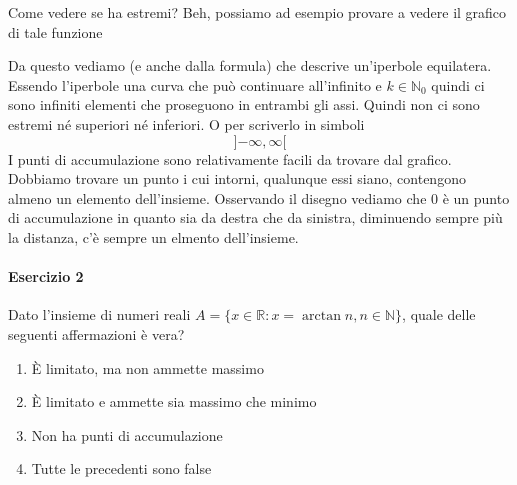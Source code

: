 Come vedere se ha estremi? Beh, possiamo ad esempio provare a vedere il grafico di tale funzione
\begin{center}
\end{center}
Da questo vediamo (e anche dalla formula) che descrive un'iperbole equilatera. Essendo l'iperbole una
curva che può continuare all'infinito e $k\in\mathbb{N}_0$ quindi ci sono infiniti elementi che 
proseguono in entrambi gli assi. Quindi non ci sono estremi né superiori né inferiori. O per scriverlo
in simboli
\begin{equation*}
{]{-\infty},{\infty}[}
\end{equation*}
I punti di accumulazione sono relativamente facili da trovare dal grafico. Dobbiamo trovare un punto
i cui intorni, qualunque essi siano, contengono almeno un elemento dell'insieme. Osservando il disegno
vediamo che $0$ è un punto di accumulazione in quanto sia da destra che da sinistra, diminuendo sempre
più la distanza, c'è sempre un elmento dell'insieme.

\paragraph{Esercizio 2}
Dato l'insieme di numeri reali $A=\{x\in\mathbb{R}: x= \arctan n, n\in\mathbb{N}\}$, quale delle
seguenti affermazioni è vera?
\begin{enumerate}
	\item È limitato, ma non ammette massimo
	\item È limitato e ammette sia massimo che minimo
	\item Non ha punti di accumulazione
	\item Tutte le precedenti sono false
\end{enumerate}
\divisor

